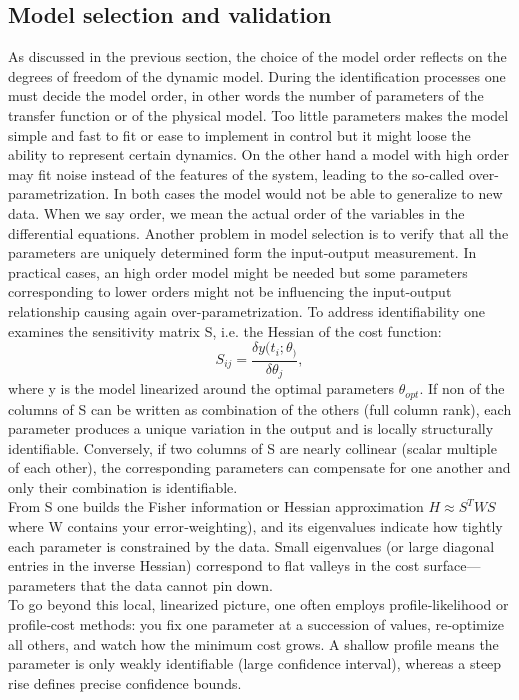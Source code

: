 \subsection{Model selection and validation}
As discussed in the previous section, the choice of the model order reflects on the degrees of freedom of the dynamic model. During the identification processes one must decide the model order, in other words the number of parameters of the transfer function or of the physical model. Too little parameters makes the model simple and fast to fit or ease to implement in control but it might loose the ability to represent certain dynamics. On the other hand a model with high order may fit noise instead of the features of the system, leading to the so-called over-parametrization. In both cases the model would not be able to generalize to new data. When we say order, we mean the actual order of the variables in the differential equations. Another problem in model selection is to verify that all the parameters are uniquely determined form the input-output measurement. In practical cases, an high order model might be needed but some parameters corresponding to lower orders might not be influencing the input-output relationship causing again over-parametrization. To address identifiability one examines the sensitivity matrix S, i.e. the Hessian of the cost function:
$$
S_{ij}=\frac{\delta y(t_i;\theta_)}{\delta \theta _j},
$$
where y is the model linearized around the optimal parameters $\theta _{opt}$. If non of the columns of S can be written as combination of the others (full column rank), each parameter produces a unique variation in the output and is locally structurally identifiable. Conversely, if two columns of S are nearly collinear (scalar multiple of each other), the corresponding parameters can compensate for one another and only their combination is identifiable.\\
From S one builds the Fisher information or Hessian approximation 
$H\approx S^TWS$
where W contains your error‐weighting), and its eigenvalues indicate how tightly each parameter is constrained by the data. Small eigenvalues (or large diagonal entries in the inverse Hessian) correspond to flat valleys in the cost surface—parameters that the data cannot pin down.\\
To go beyond this local, linearized picture, one often employs profile‐likelihood or profile‐cost methods: you fix one parameter at a succession of values, re‐optimize all others, and watch how the minimum cost grows. A shallow profile means the parameter is only weakly identifiable (large confidence interval), whereas a steep rise defines precise confidence bounds.
